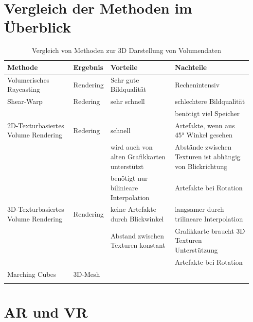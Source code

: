 

\section{Vergleich der Methoden im Überblick}											 %

\begin{longtable} {p{}p{}p{}p{}}
\toprule 
Methode & Ergebnis & Vorteile & Nachteile \\ 
\midrule 
Volumerisches Raycasting & Rendering  & Sehr gute Bildqualität & Rechenintensiv \\
\midrule 
Shear-Warp & Redering & sehr schnell& schlechtere Bildqualität\\
 & & & benötigt viel Speicher\\
\midrule 
2D-Texturbasiertes Volume Rendering & Redering & schnell & Artefakte, wenn aus 45° Winkel gesehen\\
 & &  wird auch von alten Grafikkarten unterstützt & Abstände zwischen Texturen ist abhängig von Blickrichtung \\
 & & benötigt nur bilinieare Interpolation &  Artefakte bei Rotation\\ 
\midrule 
3D-Texturbasiertes Volume Rendering & Rendering & keine Artefakte durch Blickwinkel & langsamer durch trilineare Interpolation \\
 & &  Abstand zwischen Texturen konstant & Grafikkarte braucht 3D Texturen Unterstützung\\ 
 & & & Artefakte bei Rotation\\
\midrule 
Marching Cubes & 3D-Mesh &  &\\ 
\bottomrule
\caption{\label{tab:volumeRenderingVergleich}Vergleich von Methoden zur 3D Darstellung von Volumendaten}
\end{longtable}

\section{AR und VR}		
\label{arVr}							 %

